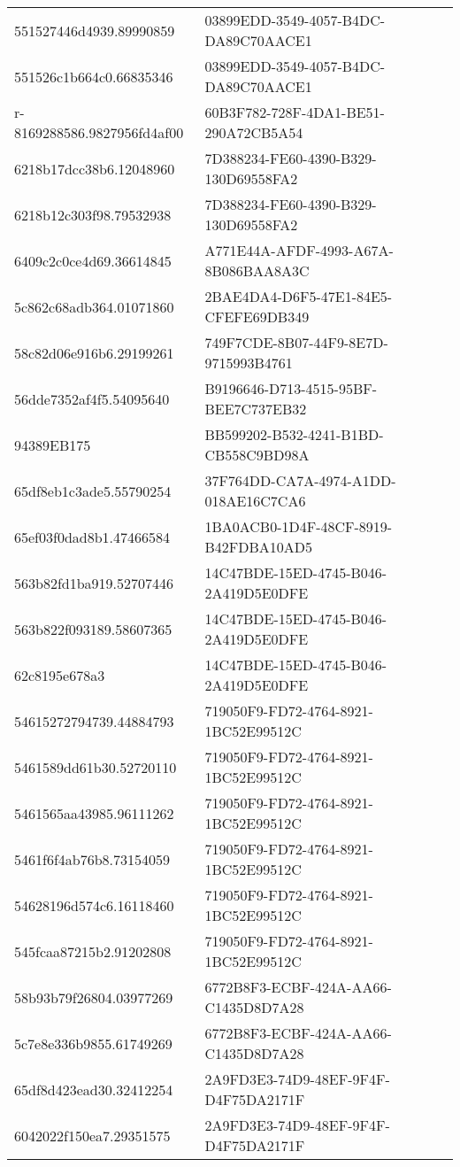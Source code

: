\begin{tabular}{ll}
551527446d4939.89990859 & 03899EDD-3549-4057-B4DC-DA89C70AACE1 \\
551526c1b664c0.66835346 & 03899EDD-3549-4057-B4DC-DA89C70AACE1 \\
r-8169288586.9827956fd4af00 & 60B3F782-728F-4DA1-BE51-290A72CB5A54 \\
6218b17dcc38b6.12048960 & 7D388234-FE60-4390-B329-130D69558FA2 \\
6218b12c303f98.79532938 & 7D388234-FE60-4390-B329-130D69558FA2 \\
6409c2c0ce4d69.36614845 & A771E44A-AFDF-4993-A67A-8B086BAA8A3C \\
5c862c68adb364.01071860 & 2BAE4DA4-D6F5-47E1-84E5-CFEFE69DB349 \\
58c82d06e916b6.29199261 & 749F7CDE-8B07-44F9-8E7D-9715993B4761 \\
56dde7352af4f5.54095640 & B9196646-D713-4515-95BF-BEE7C737EB32 \\
94389EB175 & BB599202-B532-4241-B1BD-CB558C9BD98A \\
65df8eb1c3ade5.55790254 & 37F764DD-CA7A-4974-A1DD-018AE16C7CA6 \\
65ef03f0dad8b1.47466584 & 1BA0ACB0-1D4F-48CF-8919-B42FDBA10AD5 \\
563b82fd1ba919.52707446 & 14C47BDE-15ED-4745-B046-2A419D5E0DFE \\
563b822f093189.58607365 & 14C47BDE-15ED-4745-B046-2A419D5E0DFE \\
62c8195e678a3 & 14C47BDE-15ED-4745-B046-2A419D5E0DFE \\
54615272794739.44884793 & 719050F9-FD72-4764-8921-1BC52E99512C \\
5461589dd61b30.52720110 & 719050F9-FD72-4764-8921-1BC52E99512C \\
5461565aa43985.96111262 & 719050F9-FD72-4764-8921-1BC52E99512C \\
5461f6f4ab76b8.73154059 & 719050F9-FD72-4764-8921-1BC52E99512C \\
54628196d574c6.16118460 & 719050F9-FD72-4764-8921-1BC52E99512C \\
545fcaa87215b2.91202808 & 719050F9-FD72-4764-8921-1BC52E99512C \\
58b93b79f26804.03977269 & 6772B8F3-ECBF-424A-AA66-C1435D8D7A28 \\
5c7e8e336b9855.61749269 & 6772B8F3-ECBF-424A-AA66-C1435D8D7A28 \\
65df8d423ead30.32412254 & 2A9FD3E3-74D9-48EF-9F4F-D4F75DA2171F \\
6042022f150ea7.29351575 & 2A9FD3E3-74D9-48EF-9F4F-D4F75DA2171F \\

\end{tabular}
